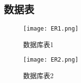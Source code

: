 \documentclass[UTF8,14pt]{article}
\numberwithin{figure}{subsubsection}
\numberwithin{table}{subsubsection}
\begin{document}
\subsection{数据表}
\begin{minipage}[t]{0.6\linewidth}
	\begin{figure}[H]
		\texttt{[image: ER1.png]}
		\caption{数据库表1}
	\end{figure}
\end{minipage}
\begin{minipage}[t]{0.4\linewidth}
	\begin{figure}[H]
		\centering
		\texttt{[image: ER2.png]}
		\caption{数据库表2}
	\end{figure}
\end{minipage}
\end{document}
